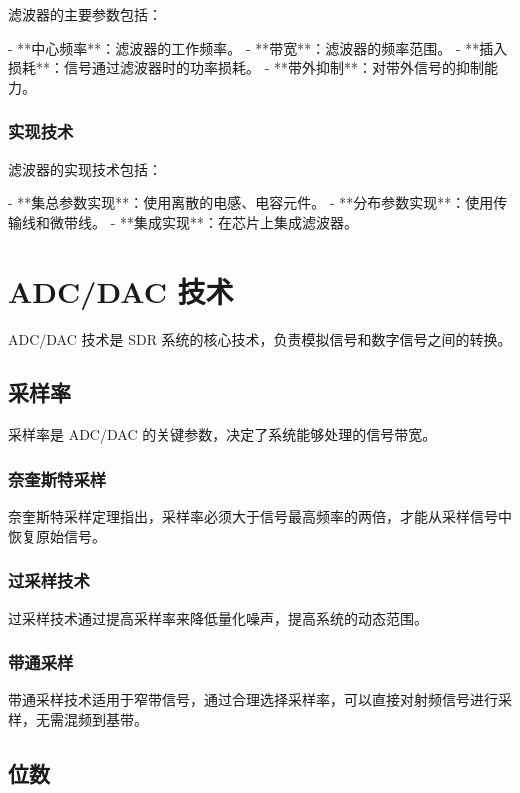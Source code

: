 \documentclass[UTF8]{ctexbook}
\begin{document}
滤波器的主要参数包括：

- **中心频率**：滤波器的工作频率。
- **带宽**：滤波器的频率范围。
- **插入损耗**：信号通过滤波器时的功率损耗。
- **带外抑制**：对带外信号的抑制能力。

\subsubsection{实现技术}

滤波器的实现技术包括：

- **集总参数实现**：使用离散的电感、电容元件。
- **分布参数实现**：使用传输线和微带线。
- **集成实现**：在芯片上集成滤波器。

\section{ADC/DAC 技术}

ADC/DAC 技术是 SDR 系统的核心技术，负责模拟信号和数字信号之间的转换。

\subsection{采样率}

采样率是 ADC/DAC 的关键参数，决定了系统能够处理的信号带宽。

\subsubsection{奈奎斯特采样}

奈奎斯特采样定理指出，采样率必须大于信号最高频率的两倍，才能从采样信号中恢复原始信号。

\subsubsection{过采样技术}

过采样技术通过提高采样率来降低量化噪声，提高系统的动态范围。

\subsubsection{带通采样}

带通采样技术适用于窄带信号，通过合理选择采样率，可以直接对射频信号进行采样，无需混频到基带。

\subsection{位数}
\end{document}
